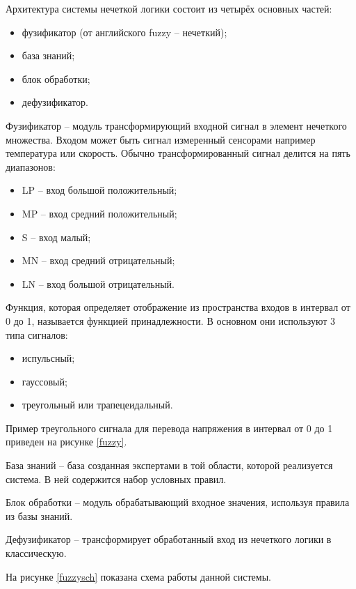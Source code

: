 Архитектура системы нечеткой логики состоит из четырёх основных частей:
\begin{itemize}
	\item фузификатор (от английского fuzzy -- нечеткий); 
	\item база знаний;
	\item блок обработки; 
	\item дефузификатор.
\end{itemize}

Фузификатор -- модуль трансформирующий входной сигнал в элемент нечеткого множества. 
Входом может быть сигнал измеренный сенсорами например температура или скорость. 
Обычно трансформированный сигнал делится на пять диапазонов:
\begin{itemize}
	\item LP -- вход большой положительный;
	\item MP -- вход средний положительный;
	\item S -- вход малый;
	\item MN -- вход средний отрицательный;
	\item LN -- вход большой отрицательный.
\end{itemize}

Функция, которая  определяет отображение из пространства входов в интервал от 0 до 1, называется функцией принадлежности. 
В основном они используют 3 типа сигналов:
\begin{itemize}
	\item испульсный;
	\item гауссовый;
	\item треугольный или трапецеидальный.
\end{itemize}

Пример треугольного сигнала для перевода напряжения в интервал от 0 до 1 приведен на рисунке \ref{fuzzy}.

База знаний  -- база созданная экспертами в той области, которой реализуется система. 
В ней содержится набор условных правил.

Блок обработки -- модуль обрабатывающий входное значения, используя правила из базы знаний.

Дефузификатор -- трансформирует обработанный вход из нечеткого логики в классическую.

На рисунке \ref{fuzzysch} показана схема работы данной системы.

